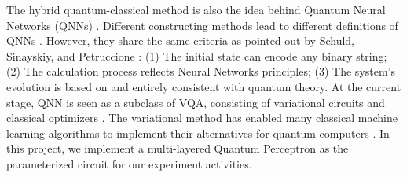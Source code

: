 The hybrid quantum-classical method is also the idea behind Quantum Neural Networks (QNNs) \cite{altaisky2001quantum}.
Different constructing methods lead to different definitions of QNNs \cite{paetznick2013, zhaoBuildingQuantumNeural2019, caoQuantumNeuronElementary2017}.
However, they share the same criteria as pointed out by Schuld, Sinayskiy, and Petruccione \cite{schuldQuestQuantumNeural2014}:
(1) The initial state can encode any binary string;
(2) The calculation process reflects Neural Networks principles;
(3) The system's evolution is based on and entirely consistent with quantum theory.
At the current stage, QNN is seen as a subclass of VQA, consisting of variational circuits and classical optimizers \cite{abbasPowerQuantumNeural2021}.
The variational method has enabled many classical machine learning algorithms to implement their alternatives for quantum computers \cite{hugginsQuantumMachineLearning2019, takakiLearningTemporalData2021, shinguBoltzmannMachineLearning2021, dallaire-demersQuantumGenerativeAdversarial2018}.
In this project, we implement a multi-layered Quantum Perceptron \cite{kristensenArtificialSpikingQuantum2021} as the parameterized circuit for our experiment activities.


